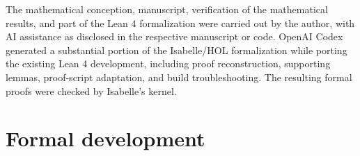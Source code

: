 \documentclass[11pt,a4paper]{article}
\begin{document}
The mathematical conception, manuscript, verification of the mathematical
results, and part of the Lean 4 formalization were carried out by the author,
with AI assistance as disclosed in the respective manuscript or code.
OpenAI Codex generated a substantial portion of the Isabelle/HOL formalization
while porting the existing Lean 4 development, including proof reconstruction,
supporting lemmas, proof-script adaptation, and build troubleshooting.
The resulting formal proofs were checked by Isabelle's kernel.



\clearpage
{}
\renewcommand{\isastyle}{\normalfont\footnotesize\itshape}
\renewcommand{\isastyletext}{\small\normalfont\rmfamily}
\sloppy
\def\ {\space\allowbreak}
\section{Formal development}

\end{document}
